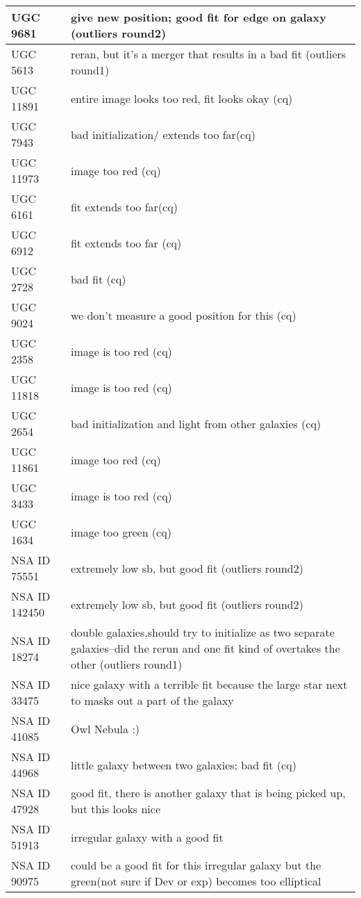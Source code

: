 \documentclass[10pt]{article}
\begin{document}
\begin{landscape}
\begin{longtable}{|l|l|}
UGC 9681 & give new position; good fit for edge on galaxy (outliers round2)\\ \hline
UGC 5613 & reran, but it's a merger that results in a bad fit (outliers round1)\\ \hline
UGC 11891 & entire image looks too red, fit looks okay (cq)\\ \hline
UGC 7943 & bad initialization/ extends too far(cq)\\ \hline
UGC 11973 & image too red (cq)\\ \hline
UGC 6161 & fit extends too far(cq)\\ \hline
UGC 6912 & fit extends too far (cq)\\ \hline
UGC 2728 & bad fit (cq)\\ \hline
UGC 9024 & we don't measure a good position for this (cq)\\ \hline
UGC 2358 & image is too red (cq)\\ \hline
UGC 11818 & image is too red (cq)\\ \hline
UGC 2654 & bad initialization and light from other galaxies (cq)\\ \hline
UGC 11861 & image too red (cq)\\ \hline
UGC 3433 & image is too red (cq)\\ \hline
UGC 1634 & image too green (cq)\\ \hline
NSA ID 75551 & extremely low sb, but good fit (outliers round2)\\ \hline
NSA ID 142450 & extremely low sb, but good fit (outliers round2)\\ \hline
NSA ID 18274 & double galaxies,should try to initialize as two separate galaxies--did the rerun and one fit kind of overtakes the other (outliers round1)\\ \hline
NSA ID 33475 & nice galaxy with a terrible fit because the large star next to masks out a part of the galaxy\\ \hline
NSA ID 41085 & Owl Nebula :)\\ \hline
NSA ID 44968 & little galaxy between two galaxies; bad fit (cq)\\ \hline
NSA ID 47928 & good fit, there is another galaxy that is being picked up, but this looks nice\\ \hline
NSA ID 51913 & irregular galaxy with a good fit\\ \hline
NSA ID 90975 & could be a good fit for this irregular galaxy but the green(not sure if Dev or exp) becomes too elliptical\\ \hline

\end{longtable}
\end{landscape}
\end{document}
